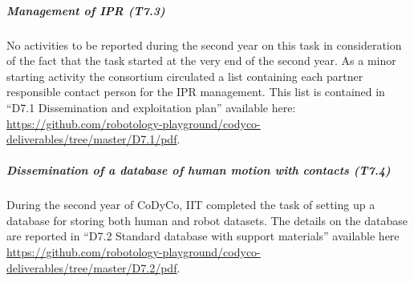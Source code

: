 \subparagraph{Management of IPR (T7.3)}

No activities to be reported during the second year on this task in consideration of the fact that the task started at the very end of the second year. As a minor starting activity the consortium circulated a list containing each partner responsible contact person for the IPR management. This list is contained in ``D7.1 Dissemination and exploitation plan'' available here: \url{https://github.com/robotology-playground/codyco-deliverables/tree/master/D7.1/pdf}.

\subparagraph{Dissemination of a database of human motion with contacts (T7.4)}

During the second year of CoDyCo, IIT completed the task of setting up a database for storing both human and robot datasets. The details on the database are reported in ``D7.2 Standard database with support materials'' available here \url{https://github.com/robotology-playground/codyco-deliverables/tree/master/D7.2/pdf}. 

